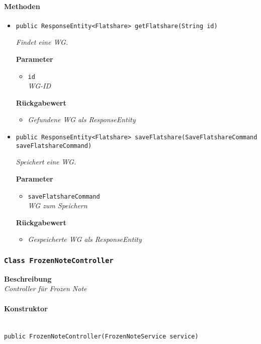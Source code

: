      \paragraph*{Methoden}
     \begin{itemize}
     	\item{\texttt{public ResponseEntity<Flatshare> getFlatshare(String id)}}
     	
     	\textit{Findet eine WG.}
     	
     	\textbf{Parameter}
     	\begin{itemize}
     		\item\texttt{id}\\
     		\textit{WG-ID} 
     	\end{itemize}
     	
       	\textbf{Rückgabewert}
       	\begin{itemize}
       		\item\textit{Gefundene WG als ResponseEntity  } 
       	\end{itemize}
       
     \item{\texttt{public ResponseEntity<Flatshare> saveFlatshare(SaveFlatshareCommand saveFlatshareCommand)}}
     	
     	\textit{Speichert eine WG.}
     	
     	\textbf{Parameter}
     	\begin{itemize}
     		\item\texttt{saveFlatshareCommand}\\
     		\textit{WG zum Speichern} 
     	\end{itemize}
     
     	\textbf{Rückgabewert}
     	\begin{itemize}
     		\item\textit{Gespeicherte WG als ResponseEntity} 
     	\end{itemize}
     \end{itemize}
 
     \subsubsection{\texttt{Class FrozenNoteController}}
     \textbf{Beschreibung} \\
     \textit{Controller für Frozen Note}
     \paragraph*{Konstruktor}\mbox{}\\
     \texttt{public FrozenNoteController(FrozenNoteService service)}
